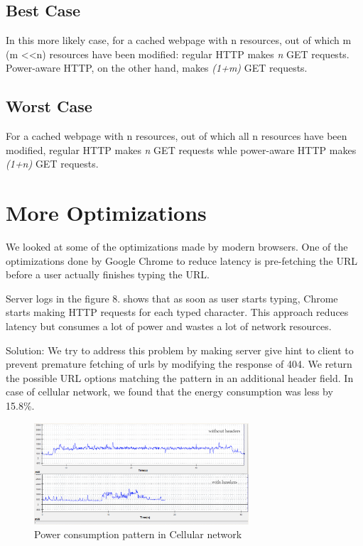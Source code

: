 \documentclass{sigplanconf}
\begin{document}
\subsection{Best Case}

In this more likely case, for a cached webpage with n resources, out of which m (m \textless \textless n) resources have been modified: regular HTTP makes {\it n} GET requests. Power-aware HTTP, on the other hand, makes {\it (1+m)} GET requests.

\subsection{Worst Case}

For a cached webpage with n resources, out of which all n resources have been modified, regular HTTP
makes {\it n} GET requests whle power-aware HTTP makes {\it (1+n)} GET requests.



\section{More Optimizations}

We looked at some of the optimizations made by modern browsers. One of the optimizations done by Google Chrome to reduce latency is pre-fetching the URL before a user actually finishes typing the URL.
 
Server logs in the figure 8. shows that as soon as user starts typing, Chrome starts making HTTP requests for each typed character. This approach reduces latency but consumes a lot of power and wastes a lot of network resources. 

Solution: We try to address this problem by making server give hint to client to prevent premature fetching of urls by modifying the response of 404. We return the possible URL options matching the pattern in an additional header field. In case of cellular network, we found that the energy consumption was less by 15.8\%.


\begin{figure}[ht!]
\centering
\includegraphics[width=80mm]{Cellular_combined.png}
\caption{Power consumption pattern in Cellular network }
\label{fig:sp_gd_mnist}
\end{figure}
\end{document}
